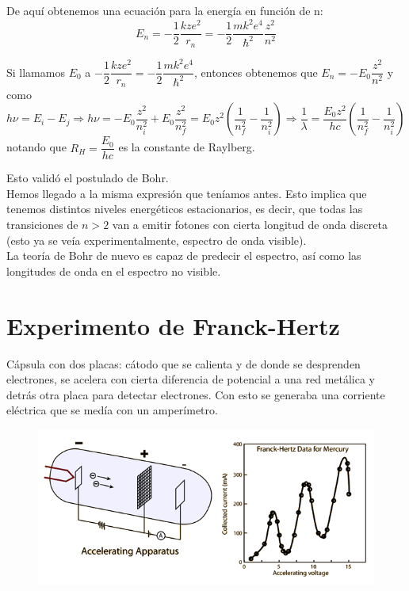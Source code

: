 \documentclass{report}
\begin{document}
    \noindent De aquí obtenemos una ecuación para la energía en función de n:
    \begin{equation}
      \boxed{E_n=-\frac12 \frac{kze^2}{r_n}=-\frac12 \frac{mk^2e^4}{\hbar^2}\frac{z^2}{n^2}}
      \label{eq:EnergiaOrbitalBohr}
    \end{equation}

    \clearpage \noindent Si llamamos $E_0$ a $-\dfrac12 \dfrac{kze^2}{r_n}=-\dfrac12 \dfrac{mk^2e^4}{\hbar^2}$, entonces obtenemos que 
    $E_n=-E_0\dfrac{z^2}{n^2}$ y como $h\nu=E_i-E_j \Rightarrow h\nu=-E_0\dfrac{z^2}{n^2_i}+E_0\dfrac{z^2}{n^2_f}=E_0z^2\left(\dfrac{1}{n^2_f}-\dfrac{1}{n^2_i}\right) \Rightarrow 
    \dfrac{1}{\lambda}=\dfrac{E_0z^2}{hc}\left(\dfrac{1}{n^2_f}-\dfrac{1}{n^2_i}\right)$ notando que $R_H=\dfrac{E_0}{hc}$ es la constante de Raylberg.\vspace{0.2cm}
    
    \noindent Esto validó el postulado de Bohr.\\

    \noindent Hemos llegado a la misma expresión que teníamos antes. Esto 
    implica que tenemos distintos niveles energéticos estacionarios, es decir, que todas 
    las transiciones de $n>2$ van a emitir fotones con cierta longitud de onda discreta 
    (esto ya se veía experimentalmente, espectro de onda visible).\\

    \noindent La teoría de Bohr de nuevo es capaz de predecir el espectro,
    así como las longitudes de onda en el espectro no visible.

  \section{Experimento de Franck-Hertz}
    \noindent Cápsula con dos placas: cátodo que se calienta y de donde se desprenden 
    electrones, se acelera con cierta diferencia de potencial a una red metálica y 
    detrás otra placa para detectar electrones. Con esto se generaba una corriente 
    eléctrica que se medía con un amperímetro.\\

    \begin{figure}
      \vspace{-0.6cm}
      \includegraphics[width=\textwidth]{fotos/T1.5.Franck-Hertz.png}
    \end{figure}
\end{document}
